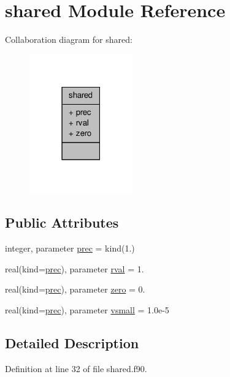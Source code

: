 \hypertarget{classshared}{\section{shared Module Reference}
\label{classshared}
}


Collaboration diagram for shared\-:\nopagebreak
\begin{figure}[H]
\begin{center}
\leavevmode
\includegraphics[width=126pt]{classshared__coll__graph}
\end{center}
\end{figure}
\subsection*{Public Attributes}
\begin{DoxyCompactItemize}
\item 
integer, parameter \hyperlink{classshared_a6d09f77f416c87d20c860fa9ee67f043}{prec} = kind(1.)
\item 
real(kind=\hyperlink{classshared_a6d09f77f416c87d20c860fa9ee67f043}{prec}), parameter \hyperlink{classshared_a1e6d2e57c52bc7d2d6e76ff50759bb36}{rval} = 1.
\item 
real(kind=\hyperlink{classshared_a6d09f77f416c87d20c860fa9ee67f043}{prec}), parameter \hyperlink{classshared_a12330d78292ab20be87d5801140eaef0}{zero} = 0.
\item 
real(kind=\hyperlink{classshared_a6d09f77f416c87d20c860fa9ee67f043}{prec}), parameter \hyperlink{classshared_a783df489735fa6181ea5fae3d6be8726}{vsmall} = 1.\-0e-\/5
\end{DoxyCompactItemize}


\subsection{Detailed Description}


Definition at line 32 of file shared.\-f90.



